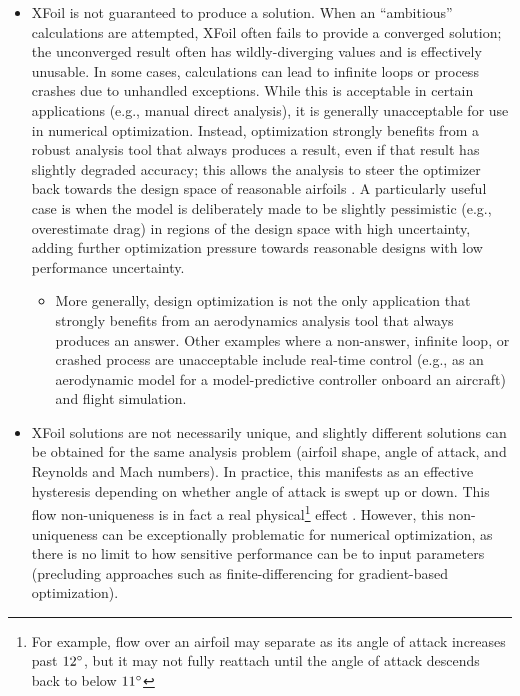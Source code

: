 \documentclass[conf]{new-aiaa}
\begin{document}
    \begin{itemize}
        \item XFoil is not guaranteed to produce a solution. When an ``ambitious'' calculations are attempted, XFoil often fails to provide a converged solution; the unconverged result often has wildly-diverging values and is effectively unusable. In some cases, calculations can lead to infinite loops or process crashes due to unhandled exceptions. While this is acceptable in certain applications (e.g., manual direct analysis), it is generally unacceptable for use in numerical optimization. Instead, optimization strongly benefits from a robust analysis tool that always produces a result, even if that result has slightly degraded accuracy; this allows the analysis to steer the optimizer back towards the design space of reasonable airfoils \cite{he2019robust}. A particularly useful case is when the model is deliberately made to be slightly pessimistic (e.g., overestimate drag) in regions of the design space with high uncertainty, adding further optimization pressure towards reasonable designs with low performance uncertainty.
        \begin{itemize}
            \item More generally, design optimization is not the only application that strongly benefits from an aerodynamics analysis tool that always produces an answer. Other examples where a non-answer, infinite loop, or crashed process are unacceptable include real-time control (e.g., as an aerodynamic model for a model-predictive controller onboard an aircraft) and flight simulation.
        \end{itemize}
        \item XFoil solutions are not necessarily unique, and slightly different solutions can be obtained for the same analysis problem (airfoil shape, angle of attack, and Reynolds and Mach numbers). In practice, this manifests as an effective hysteresis depending on whether angle of attack is swept up or down. This flow non-uniqueness is in fact a real physical\footnote{For example, flow over an airfoil may separate as its angle of attack increases past $12\degree$, but it may not fully reattach until the angle of attack descends back to below $11\degree$} effect \cite{jameson_airfoils_1991, kuzmin2012non, he2019robust}. However, this non-uniqueness can be exceptionally problematic for numerical optimization, as there is no limit to how sensitive performance can be to input parameters (precluding approaches such as finite-differencing for gradient-based optimization).

\end{itemize}
\end{document}
